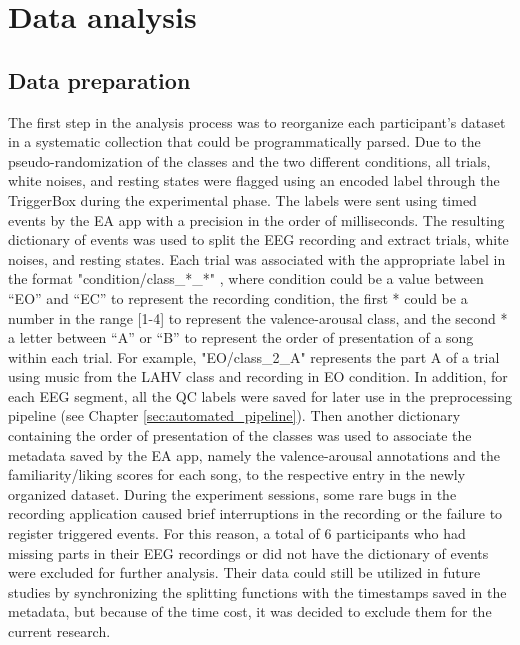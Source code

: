 \section{Data analysis}
\label{sec:data_analysis}
\subsection{Data preparation}
\label{sec:data_preparation}
The first step in the analysis process was to reorganize each participant’s dataset in a systematic collection that could be programmatically parsed. Due to the pseudo-randomization of the classes and the two different conditions, all trials, white noises, and resting states were flagged using an encoded label through the TriggerBox during the experimental phase. The labels were sent using timed events by the \ac{EA} app with a precision in the order of milliseconds. The resulting dictionary of events was used to split the \ac{EEG} recording and extract trials, white noises, and resting states. Each trial was associated with the appropriate label in the format "condition/class\_*\_*" , where condition could be a value between “EO” and “EC” to represent the recording condition, the first * could be a number in the range [1-4] to represent the valence-arousal  class, and the second * a letter between “A” or “B” to represent the order of presentation of a song within each trial. For example, "EO/class\_2\_A" represents the part A of a trial using music from the LAHV class and recording in \ac{EO} condition. In addition, for each \ac{EEG} segment, all the \ac{QC} labels were saved for later use in the preprocessing pipeline (see Chapter \ref{sec:automated_pipeline}). Then another dictionary containing the order of presentation of the classes was used to associate the metadata saved by the \ac{EA} app, namely the valence-arousal annotations and the familiarity/liking scores for each song, to the respective entry in the newly organized dataset. During the experiment sessions, some rare bugs in the recording application caused brief interruptions in the recording or the failure to register triggered events. For this reason, a total of 6 participants who had missing parts in their \ac{EEG} recordings or did not have the dictionary of events were excluded for further analysis. Their data could still be utilized in future studies by synchronizing the splitting functions with the timestamps saved in the metadata, but because of the time cost, it was decided to exclude them for the current research.


